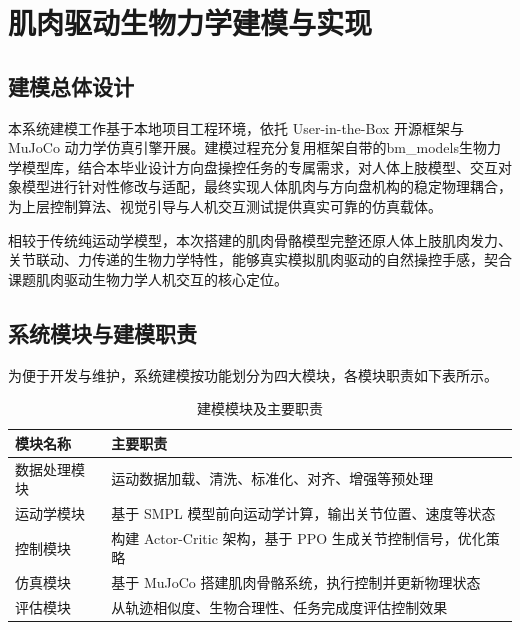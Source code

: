 \chapter{肌肉驱动生物力学建模与实现}
\section{建模总体设计}
本系统建模工作基于本地项目工程环境，依托 User-in-the-Box 开源框架与 MuJoCo 动力学仿真引擎开展。建模过程充分复用框架自带的bm\_models生物力学模型库，结合本毕业设计方向盘操控任务的专属需求，对人体上肢模型、交互对象模型进行针对性修改与适配，最终实现人体肌肉与方向盘机构的稳定物理耦合，为上层控制算法、视觉引导与人机交互测试提供真实可靠的仿真载体。

相较于传统纯运动学模型，本次搭建的肌肉骨骼模型完整还原人体上肢肌肉发力、关节联动、力传递的生物力学特性，能够真实模拟肌肉驱动的自然操控手感，契合课题肌肉驱动生物力学人机交互的核心定位。
\section{系统模块与建模职责}
为便于开发与维护，系统建模按功能划分为四大模块，各模块职责如下表所示。
\begin{table}[htbp]
  \centering
  \caption{建模模块及主要职责}
  \label{tab:module_duty}
  \begin{tabular}{ll}
    \toprule
    模块名称 & 主要职责 \\
    \midrule
    数据处理模块 & 运动数据加载、清洗、标准化、对齐、增强等预处理 \\
    运动学模块 & 基于 SMPL 模型前向运动学计算，输出关节位置、速度等状态 \\
    控制模块 & 构建 Actor-Critic 架构，基于 PPO 生成关节控制信号，优化策略 \\
    仿真模块 & 基于 MuJoCo 搭建肌肉骨骼系统，执行控制并更新物理状态 \\
    评估模块 & 从轨迹相似度、生物合理性、任务完成度评估控制效果 \\
    \bottomrule
  \end{tabular}
\end{table}

